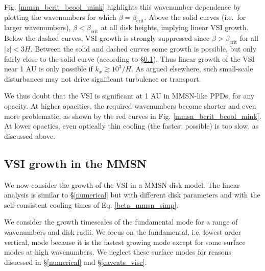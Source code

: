 Fig. \ref{mmsn_bcrit_bcool_mink} highlights this wavenumber dependence by plotting
the wavenumbers for which $\beta = \beta_\mathrm{crit}$.  Above the
solid curves (i.e.\ for larger wavenumbers), $\beta <
\beta_\mathrm{crit}$ at all disk heights, implying linear VSI growth.
Below the dashed curves, VSI growth is strongly suppressed since
$\beta >  \beta_\mathrm{crit}$ for all $|z| < 3H$.  Between the solid
and dashed curves some growth is possible, but only fairly close to
the solid curve (according to \S\ref{vsi_mmsn_grow}).  Thus linear
growth of the VSI near 1 AU is only possible if $k_x \gtrsim 10^3/H$.
As argued elsewhere, such small-scale disturbances may not 
drive significant turbulence or transport. 

We thus doubt that the VSI is significant at 1 AU in MMSN-like PPDs,
for any opacity.  At higher opacities, the required wavenumbers become
shorter and even more problematic, as shown by the red curves in
Fig. \ref{mmsn_bcrit_bcool_mink}.  At lower opacties, even optically
thin cooling (the fastest possible) is too slow, as discussed above.  




\subsection{VSI growth in the MMSN}\label{vsi_mmsn_grow}
We now consider the growth of the VSI in a MMSN disk model.  The
linear analysis is similar to  
\S\ref{numerical} but with different disk parameters and with the
self-consistent cooling times of  Eq. \ref{beta_mmsn_simp}. 

We consider the growth timescales of the fundamental mode for a range of
wavenumbers and disk radii. We focus on the fundamental, i.e. lowest order vertical, mode 
because it is the fastest growing mode except for some surface modes at high 
wavenumbers. We neglect these surface modes for reasons disucssed in
\S\ref{numerical} and \S\ref{caveats_visc}. 


